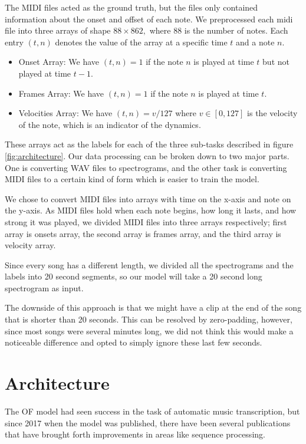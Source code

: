 \documentclass[a4paper,twocolumn,10pt]{article}
\begin{document}
The MIDI files acted as the ground truth, but the files only contained information about the onset and offset of each note. We preprocessed each midi file into three arrays of shape $88 \times 862,$ where $88$ is the number of notes. Each entry $(t,n)$ denotes the value of the array at a specific time $t$ and a note $n$.
\begin{itemize}
  \item Onset Array: We have $(t,n)=1$ if the note $n$ is played at time $t$ but not played at time $t-1.$
  \item Frames Array: We have $(t,n)=1$ if the note $n$ is played at time $t$.
  \item Velocities Array: We have $(t,n)=v/127$ where $v \in [0,127]$ is the velocity of the note, which is an indicator of the dynamics.
\end{itemize}
These arrays act as the labels for each of the three sub-tasks described in figure \ref{fig:architecture}.
Our data processing can be broken down to two major parts. One is converting WAV files to spectrograms, and the other task is converting MIDI files to a certain kind of form which is easier to train the model.

We chose to convert MIDI files into arrays with time on the x-axis and note on the y-axis. As MIDI files hold when each note begins, how long it lasts, and how strong it was played, we divided MIDI files into three arrays respectively; first array is onsets array, the second array is frames array, and the third array is velocity array.

Since every song has a different length, we divided all the spectrograms and the labels into 20 second segments, so our model will take a 20 second long spectrogram as input.

The downside of this approach is that we might have a clip at the end of the song that is shorter than 20 seconds. This can be resolved by zero-padding, however, since most songs were several minutes long, we did not think this would make a noticeable difference and opted to simply ignore these last few seconds.
\section{Architecture}
The OF model\cite{onsets_and_frames} had seen success in the task of automatic music transcription, but since 2017 when the model was published, there have been several publications that have brought forth improvements in areas like sequence processing.
\end{document}
